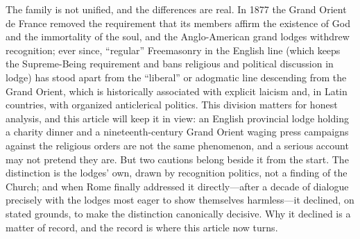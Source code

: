 The family is not unified, and the differences are real. In 1877 the Grand Orient de France removed the requirement that its members affirm the existence of God and the immortality of the soul, and the Anglo-American grand lodges withdrew recognition; ever since, ``regular'' Freemasonry in the English line (which keeps the Supreme-Being requirement and bans religious and political discussion in lodge) has stood apart from the ``liberal'' or adogmatic line descending from the Grand Orient, which is historically associated with explicit laicism and, in Latin countries, with organized anticlerical politics. This division matters for honest analysis, and this article will keep it in view: an English provincial lodge holding a charity dinner and a nineteenth-century Grand Orient waging press campaigns against the religious orders are not the same phenomenon, and a serious account may not pretend they are. But two cautions belong beside it from the start. The distinction is the lodges' own, drawn by recognition politics, not a finding of the Church; and when Rome finally addressed it directly---after a decade of dialogue precisely with the lodges most eager to show themselves harmless---it declined, on stated grounds, to make the distinction canonically decisive. Why it declined is a matter of record, and the record is where this article now turns.
